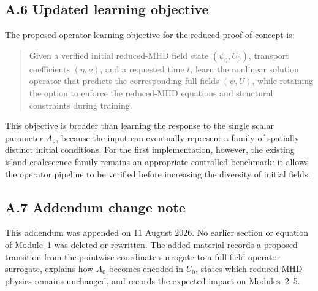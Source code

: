 \documentclass[11pt]{article}
\begin{document}
\subsection*{A.6 Updated learning objective}

The proposed operator-learning objective for the reduced proof of concept is:
\begin{quote}
Given a verified initial reduced-MHD field state $(\psi_0,U_0)$, transport
coefficients $(\eta,\nu)$, and a requested time $t$, learn the nonlinear
solution operator that predicts the corresponding full fields $(\psi,U)$,
while retaining the option to enforce the reduced-MHD equations and structural
constraints during training.
\end{quote}

This objective is broader than learning the response to the single scalar
parameter $A_0$, because the input can eventually represent a family of
spatially distinct initial conditions.  For the first implementation, however,
the existing island-coalescence family remains an appropriate controlled
benchmark: it allows the operator pipeline to be verified before increasing
the diversity of initial fields.

\subsection*{A.7 Addendum change note}

This addendum was appended on 11 August 2026.  No earlier section or equation
of Module~1 was deleted or rewritten.  The added material records a proposed
transition from the pointwise coordinate surrogate to a full-field operator
surrogate, explains how $A_0$ becomes encoded in $U_0$, states which reduced-MHD
physics remains unchanged, and records the expected impact on Modules~2--5.
\end{document}
